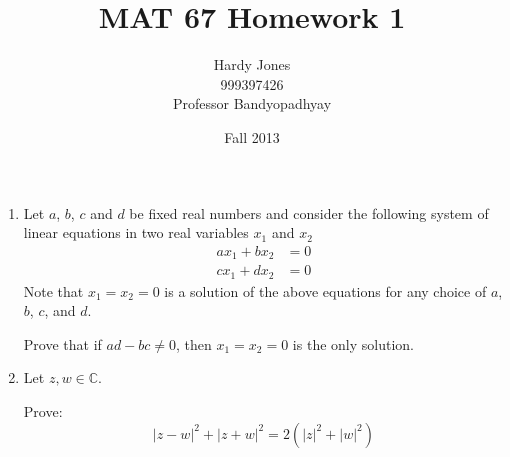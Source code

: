 \documentclass[12pt,letterpaper]{article}
\title{MAT 67 Homework 1\vspace{-2ex}}
\author{Hardy Jones\\
        999397426\\
        Professor Bandyopadhyay\vspace{-2ex}}
\date{Fall 2013}
\begin{document}
  \maketitle

  \begin{enumerate}
    \item
      Let $a$, $b$, $c$ and $d$ be fixed real numbers and
      consider the following system of linear equations in two real variables
      $x_1$ and $x_2$
      \begin{align*}
        ax_1 + bx_2 &= 0 \\
        cx_1 + dx_2 &= 0
      \end{align*}
      Note that $x_1 = x_2 = 0$ is a solution of the above equations for any
      choice of $a$, $b$, $c$, and $d$.

      Prove that if $ad - bc \neq 0$, then $x_1 = x_2 = 0$ is the only solution.

    \item
      Let $z, w \in \mathbb{C}$.

      Prove:
      \[|z - w|^2 + |z + w|^2 = 2(|z|^2 + |w|^2)\]
  \end{enumerate}
\end{document}

